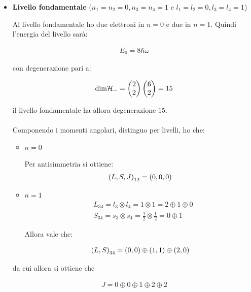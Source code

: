 \begin{itemize}

	\item \textbf{Livello fondamentale} ($n_1 = n_2 = 0, n_3 = n_4 = 1$ e $l_1 = l_2 = 0, l_3 = l_4 = 1$)
	
		Al livello fondamentale ho due elettroni in $n = 0$ e due in $n = 1$. Quindi l'energia del livello sarà:
		
	\begin{align*}	
		E_0 = 8 \hbar \omega
	\end{align*}
	
		con degenerazione pari a:
		
	\begin{align*}
		\text{dim} \mathcal{H}_- = \mqty(2 \\ 2) \, \mqty(6 \\ 2) = 15
	\end{align*}
	
		il livello fondamentale ha allora degenerazione $15$.
		\\
		\\
		Componendo i momenti angolari, distinguo per livelli, ho che:
		
	\begin{itemize}
		\item $n = 0$
		
			Per antisimmetria si ottiene:
		\begin{align*}
			\qty(L, S, J)_{12} = \qty(0, 0, 0)
		\end{align*}

		\item $n = 1$
		\begin{align*}
			& L_{34} = l_3 \otimes l_4 = 1 \otimes 1 = 2 \oplus 1 \oplus 0 \\
			& S_{34} = s_3 \otimes s_4 = \frac{1}{2} \otimes \frac{1}{2} = 0 \oplus 1
		\end{align*}
		
			Allora vale che:
			
		\begin{align*}
			\qty(L, S)_{34} = \qty(0, 0) \oplus \qty(1, 1) \oplus \qty(2, 0)
		\end{align*}

	\end{itemize}

		da cui allora si ottiene che
		
	\begin{align*}
		J = 0 \oplus 0 \oplus 1 \oplus 2 \oplus 2
	\end{align*}
	

\end{itemize}
